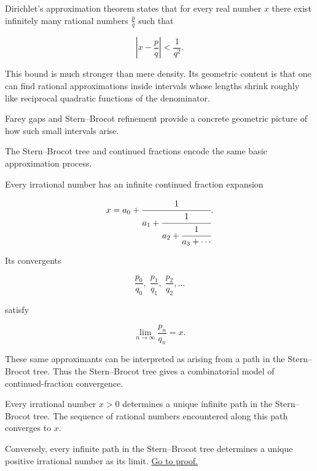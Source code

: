 
\begin{remark*}
Dirichlet's approximation theorem states that for every real number $x$
there exist infinitely many rational numbers $\frac{p}{q}$ such that

\[
\left|x-\frac{p}{q}\right| < \frac{1}{q^2}.
\]

This bound is much stronger than mere density.  Its geometric content is
that one can find rational approximations inside intervals whose lengths
shrink roughly like reciprocal quadratic functions of the denominator.

Farey gaps and Stern--Brocot refinement provide a concrete geometric
picture of how such small intervals arise.
\end{remark*}


\begin{remark*}
The Stern--Brocot tree and continued fractions encode the same basic
approximation process.

Every irrational number has an infinite continued fraction expansion

\[
x
=
a_0 +
\cfrac{1}{a_1 +
\cfrac{1}{a_2 +
\cfrac{1}{a_3 + \cdots}}}.
\]

Its convergents

\[
\frac{p_0}{q_0},\;
\frac{p_1}{q_1},\;
\frac{p_2}{q_2},\dots
\]

satisfy

\[
\lim_{n\to\infty}\frac{p_n}{q_n}=x.
\]

These same approximants can be interpreted as arising from a path in
the Stern--Brocot tree.  Thus the Stern--Brocot tree gives a
combinatorial model of continued-fraction convergence.
\end{remark*}


\begin{theorem}
\label{thm:stern-brocot-limit}

Every irrational number $x>0$ determines a unique infinite path in the
Stern--Brocot tree.  The sequence of rational numbers encountered along
this path converges to $x$.

Conversely, every infinite path in the Stern--Brocot tree determines a
unique positive irrational number as its limit.
\hyperref[prf:stern-brocot-limit]{Go to proof.}
\end{theorem}

